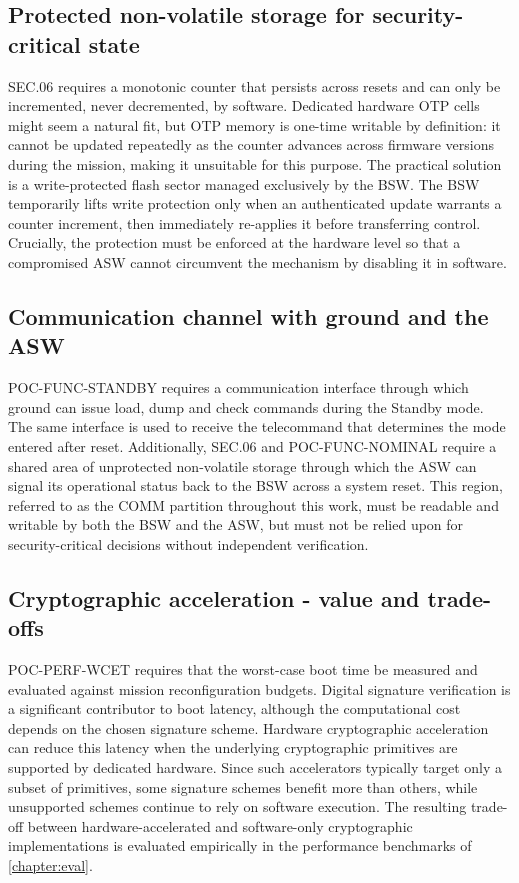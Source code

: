 \subsection{Protected non-volatile storage for security-critical state}

SEC.06 requires a monotonic counter that persists across resets and can only be incremented, never decremented, by software. Dedicated hardware OTP cells might seem a natural fit, but OTP memory is one-time writable by definition: it cannot be updated repeatedly as the counter advances across firmware versions during the mission, making it unsuitable for this purpose. The practical solution is a write-protected flash sector managed exclusively by the BSW. The BSW temporarily lifts write protection only when an authenticated update warrants a counter increment, then immediately re-applies it before transferring control. Crucially, the protection must be enforced at the hardware level so that a compromised ASW cannot circumvent the mechanism by disabling it in software.

\subsection{Communication channel with ground and the ASW}

POC-FUNC-STANDBY requires a communication interface through which ground can issue load, dump and check commands during the Standby mode. The same interface is used to receive the telecommand that determines the mode entered after reset. Additionally, SEC.06 and POC-FUNC-NOMINAL require a shared area of unprotected non-volatile storage through which the ASW can signal its operational status back to the BSW across a system reset. This region, referred to as the COMM partition throughout this work, must be readable and writable by both the BSW and the ASW, but must not be relied upon for security-critical decisions without independent verification.

\subsection{Cryptographic acceleration - value and trade-offs}

POC-PERF-WCET requires that the worst-case boot time be measured and evaluated against mission reconfiguration budgets. Digital signature verification is a significant contributor to boot latency, although the computational cost depends on the chosen signature scheme. Hardware cryptographic acceleration can reduce this latency when the underlying cryptographic primitives are supported by dedicated hardware. Since such accelerators typically target only a subset of primitives, some signature schemes benefit more than others, while unsupported schemes continue to rely on software execution. The resulting trade-off between hardware-accelerated and software-only cryptographic implementations is evaluated empirically in the performance benchmarks of \autoref{chapter:eval}.


